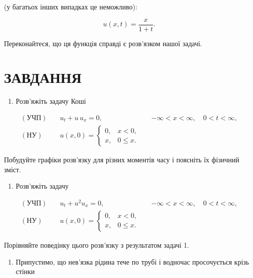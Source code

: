 \documentclass[
  ukrainian,
]{article}
\providecommand{\tightlist}{%
  \setlength{\itemsep}{0pt}\setlength{\parskip}{0pt}}
\begin{document}
(у багатьох інших випадках це неможливо):

\[
u(x,t)=\frac{x}{1+t}.
\]

Переконайтеся, що ця функція справді є розв'язком нашої задачі.

\section{ЗАВДАННЯ}\label{ux437ux430ux432ux434ux430ux43dux43dux44f-17}

\begin{enumerate}
\def\labelenumi{\arabic{enumi}.}
\tightlist
\item
  Розв'яжіть задачу Коші
\end{enumerate}

\[
\begin{aligned}
(\text{УЧП})\quad & u_t + u\,u_x = 0, && -\infty < x < \infty,\quad 0 < t < \infty, \\
(\text{НУ})\quad &
u(x,0)=
\begin{cases}
0, & x < 0,\\
x, & 0 \le x.
\end{cases}
\end{aligned}
\]

Побудуйте графіки розв'язку для різних моментів часу і поясніть їх
фізичний зміст.

\begin{enumerate}
\def\labelenumi{\arabic{enumi}.}
\setcounter{enumi}{1}
\tightlist
\item
  Розв'яжіть задачу
\end{enumerate}

\[
\begin{aligned}
(\text{УЧП})\quad & u_t + u^2 u_x = 0, && -\infty < x < \infty,\quad 0 < t < \infty, \\
(\text{НУ})\quad &
u(x,0)=
\begin{cases}
0, & x < 0,\\
x, & 0 \le x.
\end{cases}
\end{aligned}
\]

Порівняйте поведінку цього розв'язку з результатом задачі 1.

\begin{enumerate}
\def\labelenumi{\arabic{enumi}.}
\setcounter{enumi}{2}
\tightlist
\item
  Припустимо, що нев'язка рідина тече по трубі і водночас просочується
  крізь стінки
\end{enumerate}
\end{document}
